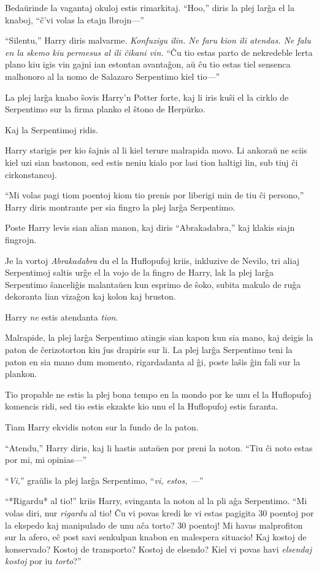 Bedaŭrinde la vagantaj okuloj estis rimarkitaj. ``Hoo,'' diris la plej
larĝa el la knaboj, ``ĉ'vi volas la etajn lbrojn—''

``Silentu,'' Harry diris malvarme. \emph{Konfuzigu ilin. Ne faru kion
ili atendas. Ne falu en la skemo kiu permesus al ili ĉikani vin.} ``Ĉu
tio estas parto de nekredeble lerta plano kiu igis vin gajni ian
estontan avantaĝon, aŭ ĉu tio estas tiel sensenca malhonoro al la nomo
de Salazaro Serpentimo kiel tio—''

La plej larĝa knabo ŝovis Harry'n Potter forte, kaj li iris kuŝi el la
cirklo de Serpentimo sur la firma planko el ŝtono de Herpŭrko.

Kaj la Serpentimoj ridis.

Harry starigis per kio ŝajnis al li kiel terure malrapida movo. Li
ankoraŭ ne sciis kiel uzi sian bastonon, sed estis neniu kialo por
lasi tion haltigi lin, sub tiuj ĉi cirkonstancoj.

``Mi volas pagi tiom poentoj kiom tio prenis por liberigi min de tiu
ĉi persono,'' Harry diris montrante per sia fingro la plej larĝa
Serpentimo.

Poste Harry levis sian alian manon, kaj diris ``Abrakadabra,'' kaj
klakis siajn fingrojn.

Je la vortoj \emph{Abrakadabra} du el la Huflopufoj kriis, inkluzive
de Nevilo, tri aliaj Serpentimoj saltis urĝe el la vojo de la fingro
de Harry, lak la plej larĝa Serpentimo ŝanceliĝis malantaŭen kun
esprimo de ŝoko, subita makulo de ruĝa dekoranta lian vizaĝon kaj kolon
kaj bruston.

Harry \emph{ne} estis atendanta \emph{tion}.

Malrapide, la plej larĝa Serpentimo atingis sian kapon kun sia mano,
kaj deigis la paton de ĉerizotorton kiu ĵus drapiris sur li. La plej
larĝa Serpentimo teni la paton en sia mano dum momento, rigardadanta
al ĝi, poste laŝis ĝin fali sur la plankon.

Tio propable ne estis la plej bona tempo en la mondo por ke unu el la
Huflopufoj komencis ridi, sed tio estis ekzakte kio unu el la
Huflopufoj estis faranta.

Tiam Harry ekvidis noton sur la fundo de la paton.

``Atendu,'' Harry diris, kaj li hastis antaŭen por preni la
noton. ``Tiu ĉi noto estas por mi, mi opinias—''

``\emph{Vi,}'' graŭlis la plej larĝa Serpentimo, ``\emph{vi, estos, —}''

``*Rigardu* al tio!'' kriis Harry, svinganta la noton al la pli aĝa
Serpentimo. ``Mi volas diri, nur \emph{rigardu} al tio! Ĉu vi povas
kredi ke vi estas pagigita 30 poentoj por la ekspedo kaj manipulado de
unu aĉa torto? 30 poentoj! Mi havas malprofiton sur la afero, eĉ post
savi senkulpan knabon en malespera situacio! Kaj kostoj de konservado?
Kostoj de transporto? Kostoj de elsendo? Kiel vi povas havi
\emph{elsendaj kostoj} por iu \emph{torto}?''

